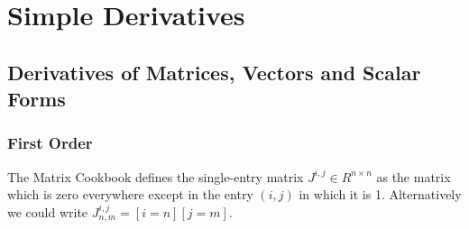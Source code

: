 \documentclass[oneside]{book}
\begin{document}
\chapter{Simple Derivatives}

\section{Derivatives of Matrices, Vectors and Scalar Forms}

\subsection{First Order}

The Matrix Cookbook defines the single-entry matrix $J^{i,j} \in R^{n\times n}$ as the matrix which is zero everywhere except in the entry $(i, j)$ in which it is 1.
Alternatively we could write $J^{i,j}_{n,m} = [i=n][j=m]$.
\end{document}
